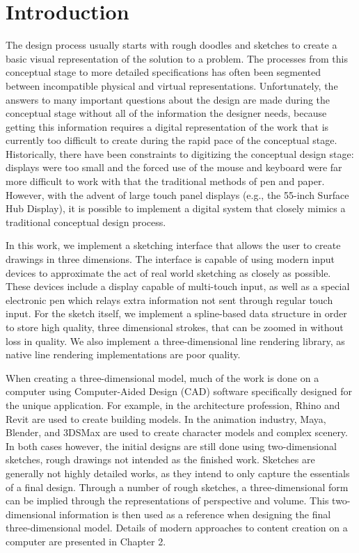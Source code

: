 \chapter{Introduction}

The design process usually starts with rough doodles and sketches to create a basic visual representation of the solution to a problem.
The processes from this conceptual stage to more detailed specifications has often been segmented between incompatible physical and virtual representations.
Unfortunately, the answers to many important questions about the design are made during the conceptual stage without all of the information the designer needs, because getting this information requires a digital representation of the work that is currently too difficult to create during the rapid pace of the conceptual stage.
Historically, there have been constraints to digitizing the conceptual design stage: displays were too small and the forced use of the mouse and keyboard were far more difficult to work with that the traditional methods of pen and paper.
However, with the advent of large touch panel displays (e.g., the 55-inch Surface Hub Display), it is possible to implement a digital system that closely mimics a traditional conceptual design process.

In this work, we implement a sketching interface that allows the user to create drawings in three dimensions.
The interface is capable of using modern input devices to approximate the act of real world sketching as closely as possible.
These devices include a display capable of multi-touch input, as well as a special electronic pen which relays extra information
not sent through regular touch input.
For the sketch itself, we implement a spline-based data structure in order to store high quality, three dimensional strokes, that can be zoomed in without loss in quality.
We also implement a three-dimensional line rendering library, as native line rendering implementations are poor quality.

When creating a three-dimensional model, much of the work is done on a computer using Computer-Aided Design (CAD) software specifically designed for the unique application.
For example, in the architecture profession, Rhino and Revit are used to create building models.
In the animation industry, Maya, Blender, and 3DSMax are used to create character models and complex scenery.
In both cases however, the initial designs are still done using two-dimensional sketches, rough drawings not intended as the finished work.
Sketches are generally not highly detailed works, as they intend to only capture the essentials of a final design.
Through a number of rough sketches, a three-dimensional form can be implied through the representations of perspective and volume.
This two-dimensional information is then used as a reference when designing the final three-dimensional model.
Details of modern approaches to content creation on a computer are presented in Chapter 2.

